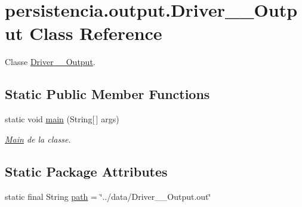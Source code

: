 \hypertarget{classpersistencia_1_1output_1_1Driver____Output}{}\section{persistencia.\+output.\+Driver\+\_\+\+\_\+\+Output Class Reference}
\label{classpersistencia_1_1output_1_1Driver____Output}


Classe \hyperlink{classpersistencia_1_1output_1_1Driver____Output}{Driver\+\_\+\+\_\+\+Output}.  


\subsection*{Static Public Member Functions}
\begin{DoxyCompactItemize}
\item 
static void \hyperlink{classpersistencia_1_1output_1_1Driver____Output_a1fcfdd813a7c5460772e74b5709fc030}{main} (String\mbox{[}$\,$\mbox{]} args)
\begin{DoxyCompactList}\small\item\em \hyperlink{classMain}{Main} de la classe. \end{DoxyCompactList}\end{DoxyCompactItemize}
\subsection*{Static Package Attributes}
\begin{DoxyCompactItemize}
\item 
static final String \hyperlink{classpersistencia_1_1output_1_1Driver____Output_a1701bae356c7bf388a5466895c22ff64}{path} = \char`\"{}../data/Driver\+\_\+\+\_\+\+Output.\+out\char`\"{}
\end{DoxyCompactItemize}
